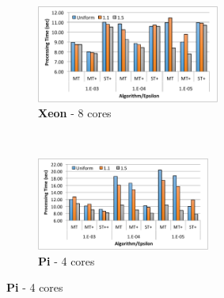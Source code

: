 \documentclass[runningheads]{llncs}
\begin{document}
\begin{figure}[htbp]
    \centering
    \begin{subfigure}[b]{0.47\textwidth}
        \centering
        \includegraphics[width = 6cm]{figs/main_1_8.pdf}
        \caption{{\bf Xeon} - 8 cores}
    \end{subfigure}\hspace*{1ex}
    ~
    \begin{subfigure}[b]{0.47\textwidth}
        \centering
        \includegraphics[width = 5.7cm]{figs/main_2_4.pdf}
        \caption{{\bf Pi} - 4 cores}
    \end{subfigure}
    

\end{figure}
\end{document}
